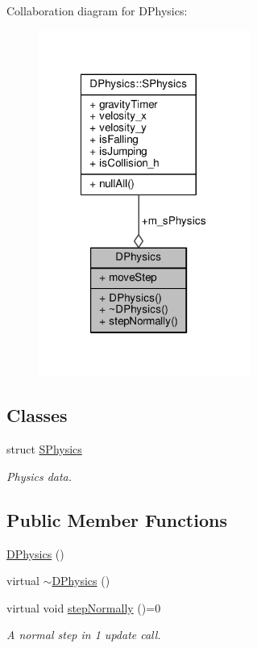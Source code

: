 Collaboration diagram for D\-Physics\-:\nopagebreak
\begin{figure}[H]
\begin{center}
\leavevmode
\includegraphics[width=197pt]{classDPhysics__coll__graph}
\end{center}
\end{figure}
\subsection*{Classes}
\begin{DoxyCompactItemize}
\item 
struct \hyperlink{structDPhysics_1_1SPhysics}{S\-Physics}
\begin{DoxyCompactList}\small\item\em Physics data. \end{DoxyCompactList}\end{DoxyCompactItemize}
\subsection*{Public Member Functions}
\begin{DoxyCompactItemize}
\item 
\hyperlink{classDPhysics_a3ce58ebc308881f3eb0cff60ff1eff45}{D\-Physics} ()
\item 
virtual \hyperlink{classDPhysics_aad555af54aca363984d0fcf34d044ba5}{$\sim$\-D\-Physics} ()
\item 
virtual void \hyperlink{classDPhysics_a414316ffcec06dbf01ced086bbb92b55}{step\-Normally} ()=0
\begin{DoxyCompactList}\small\item\em A normal step in 1 update call. \end{DoxyCompactList}\end{DoxyCompactItemize}
